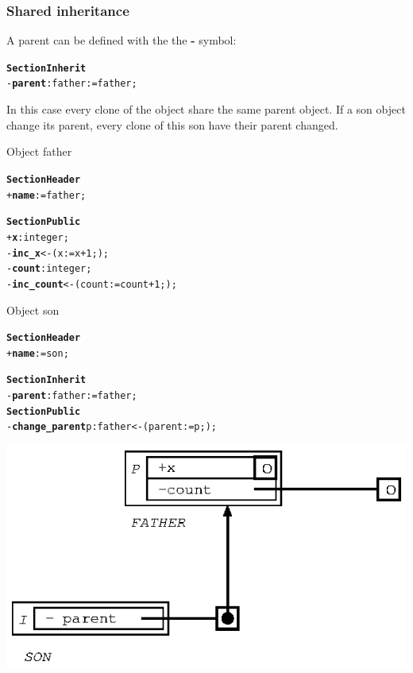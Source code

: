 \documentclass[11pt]{mybook}
\begin{document}
\subsubsection{Shared inheritance}
\label{language_reference:section_identifiers:inherit_section:shared_inheritance}
%
A parent can be defined with the the {\bf{} -} symbol:
\begin{alltt}
{\bf{}Section Inherit}
  - {\bf{} parent}:{\sc{}father} := {\sc{}father};
\end{alltt}
In this case every clone of the object share the same parent object. If a son object change its parent, every clone of this son have their parent changed.
\begin{center}
Object {\sc{}father}
\end{center}
\begin{alltt} 
{\bf{}Section Header}
  + {\bf{}name}     := {\sc{}father};          

{\bf{}Section Public}
  + {\bf{}x}    :{\sc{}integer};
  - {\bf{}inc\_x} <- ( x := x + 1; );
  - {\bf{}count}:{\sc{}integer};
  - {\bf{}inc\_count} <- ( count := count + 1; );
\end{alltt}
\begin{center}
Object {\sc{}son}
\end{center}
\begin{alltt} 
{\bf{}Section Header}
  + {\bf{}name}     := {\sc{}son};          

{\bf{}Section Inherit}
  - {\bf{}parent}:{\sc{}father} := {\sc{}father};
{\bf{}Section Public}
  - {\bf{}change\_parent} p:{\sc{}father} <- ( parent := p; );
\end{alltt}
\begin{center}
\includegraphics[scale=1.0]{figures/inherit_minus_0}
\end{center}
\end{document}
